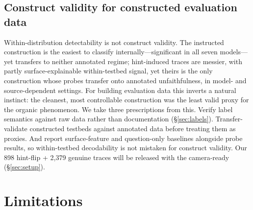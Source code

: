 \documentclass{article}
\begin{document}
\subsection{Construct validity for constructed evaluation data}
Within-distribution detectability is not construct validity. The instructed construction is the easiest to classify internally---significant in all seven models---yet transfers to neither annotated regime; hint-induced traces are messier, with partly surface-explainable within-testbed signal, yet theirs is the only construction whose probes transfer onto annotated unfaithfulness, in model- and source-dependent settings. For building evaluation data this inverts a natural instinct: the cleanest, most controllable construction was the least valid proxy for the organic phenomenon. We take three prescriptions from this. Verify label semantics against raw data rather than documentation (\S\ref{sec:labels}). Transfer-validate constructed testbeds against annotated data before treating them as proxies. And report surface-feature and question-only baselines alongside probe results, so within-testbed decodability is not mistaken for construct validity. Our 898 hint-flip + 2{,}379 genuine traces will be released with the camera-ready (\S\ref{sec:setup}).


\section{Limitations}
\end{document}
